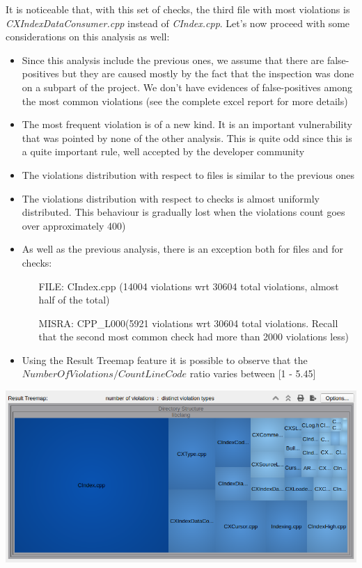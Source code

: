 It is noticeable that, with this set of checks, the third file with most violations is \textsl{CXIndexDataConsumer.cpp} instead of \textsl{CIndex.cpp}.\newline
Let's now proceed with some considerations on this analysis as well:

\begin{itemize}
	\item Since this analysis include the previous ones, we assume that there are false-positives but they are caused mostly by the fact that the inspection was done on a subpart of the project. We don't have evidences of false-positives among the most common violations (see the complete excel report for more details)
	\item The most frequent violation is of a new kind. It is an important vulnerability that was pointed by none of the other analysis. This is quite odd since this is a quite important rule, well accepted by the developer community
	\item The violations distribution with respect to files is similar to the previous ones
	\item The violations distribution with respect to checks is almost uniformly distributed. This behaviour is gradually lost when the violations count goes over approximately 400)
	\item As well as the previous analysis, there is an exception both for files and for checks:
	\begin{itemize}
		\item[FILE: ] CIndex.cpp (14004 violations wrt 30604 total violations, almost half of the total)
		\item[MISRA: ] CPP\_L000(5921 violations wrt 30604 total violations. Recall that the second most common check had more than 2000 violations less)
	\end{itemize}
	\item Using the Result Treemap feature it is possible to observe that the $NumberOfViolations/CountLineCode$ ratio varies between [1 - 5.45]
\end{itemize}

\begin{minipage}{\linewidth}
	\includegraphics[width=\textwidth]{img/AllChecksTreeMap.png}
\end{minipage}

